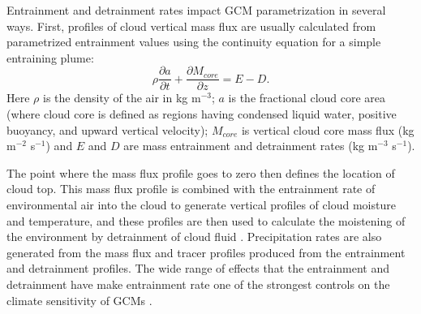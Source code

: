 \documentclass[12pt]{article}
\begin{document}
Entrainment and detrainment rates impact GCM parametrization in several ways.
First, profiles of cloud vertical mass flux are usually calculated from 
parametrized entrainment values using the continuity equation for a 
simple entraining plume:
\begin{equation}
   \label{eq:continuity}
   \rho \frac{\partial a}{\partial t} 
   + \frac{\partial M_{core}}{\partial z} = E - D.
\end{equation}
Here $\rho$ is the
density of the air in kg m$^{-3}$; $a$ is the fractional cloud core area
(where cloud core is defined as
regions having condensed liquid water, positive buoyancy, and upward vertical
velocity); $M_{core}$ is vertical cloud core
mass flux (kg m$^{-2}$ s$^{-1}$) and $E$ and $D$ are mass entrainment
and detrainment rates (kg m$^{-3}$ s$^{-1}$). 

The point where the mass flux profile goes to zero then defines the location 
of cloud top.  This mass flux profile is combined with the entrainment rate 
of environmental air into the cloud to generate vertical profiles of cloud
moisture and temperature, and these profiles are then used to calculate the
moistening of the environment by detrainment of cloud fluid 
\citep{Tiedtke1989, Kain1990}.  Precipitation rates are also generated from the
mass flux and tracer profiles produced from the entrainment and detrainment
profiles.  The wide range of effects that the entrainment and detrainment have
make entrainment rate one of the strongest controls on the climate sensitivity 
of GCMs \citep{Stainforth2005, Rougier2009}.
\end{document}
